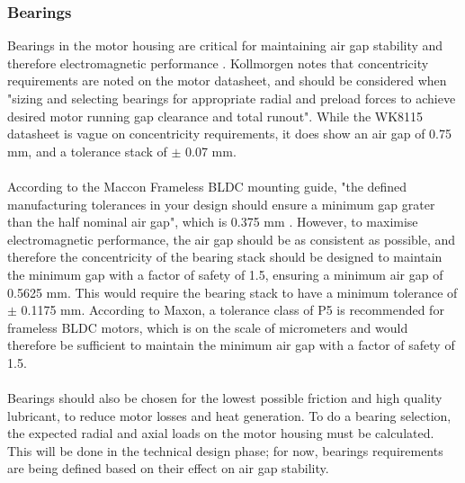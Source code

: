 \documentclass[internal]{../../classes/nervtech-research}
\begin{document}
\subsubsection{Bearings}
Bearings in the motor housing are critical for maintaining air gap stability and therefore electromagnetic performance \cite{KollmorgenManual}.
Kollmorgen notes that concentricity requirements are noted on the motor datasheet, and should be considered when "sizing and selecting bearings for appropriate radial and preload forces to achieve desired motor running gap clearance and total runout".
While the WK8115 datasheet is vague on concentricity requirements, it does show an air gap of 0.75 mm, and a tolerance stack of $\pm$ 0.07 mm.
\\\\
According to the Maccon Frameless BLDC mounting guide, "the defined manufacturing tolerances in your design should ensure a minimum gap grater
than the half nominal air gap", which is 0.375 mm \cite{MacconManual}.
However, to maximise electromagnetic performance, the air gap should be as consistent as possible, and therefore the concentricity of the bearing stack should be designed to maintain the minimum gap with a factor of safety of 1.5, ensuring a minimum air gap of 0.5625 mm.
This would require the bearing stack to have a minimum tolerance of $\pm$ 0.1175 mm.
According to Maxon, a tolerance class of P5 is recommended for frameless BLDC motors, which is on the scale of micrometers and would therefore be sufficient to maintain the minimum air gap with a factor of safety of 1.5. \cite{MaxonManual}
\\\\
Bearings should also be chosen for the lowest possible friction and high quality lubricant, to reduce motor losses and heat generation.
To do a bearing selection, the expected radial and axial loads on the motor housing must be calculated.
This will be done in the technical design phase; for now, bearings requirements are being defined based on their effect on air gap stability.
\end{document}
